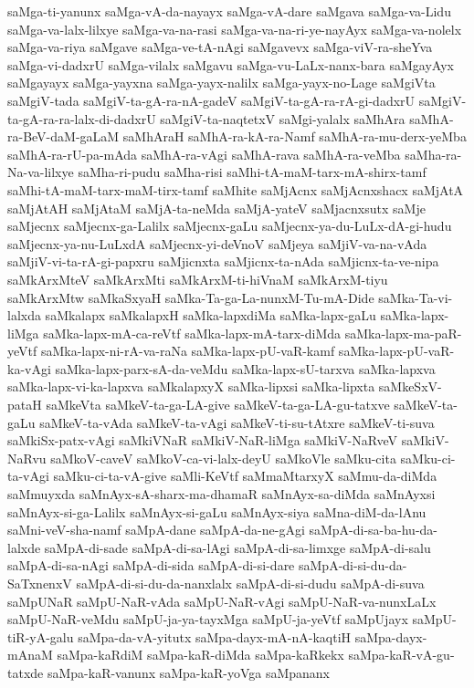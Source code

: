 {saMga-ti-yanunx
saMga-vA-da-nayayx
saMga-vA-dare
saMgava
saMga-va-Lidu
saMga-va-lalx-lilxye
saMga-va-na-rasi
saMga-va-na-ri-ye-nayAyx
saMga-va-nolelx
saMga-va-riya
saMgave
saMga-ve-tA-nAgi
saMgavevx
saMga-viV-ra-sheYva
saMga-vi-dadxrU
saMga-vilalx
saMgavu
saMga-vu-LaLx-nanx-bara
saMgayAyx
saMgayayx
saMga-yayxna
saMga-yayx-nalilx
saMga-yayx-no-Lage
saMgiVta
saMgiV-tada
saMgiV-ta-gA-ra-nA-gadeV
saMgiV-ta-gA-ra-rA-gi-dadxrU
saMgiV-ta-gA-ra-ra-lalx-di-dadxrU
saMgiV-ta-naqtetxV
saMgi-yalalx
saMhAra
saMhA-ra-BeV-daM-gaLaM
saMhAraH
saMhA-ra-kA-ra-Namf
saMhA-ra-mu-derx-yeMba
saMhA-ra-rU-pa-mAda
saMhA-ra-vAgi
saMhA-rava
saMhA-ra-veMba
saMha-ra-Na-va-lilxye
saMha-ri-pudu
saMha-risi
saMhi-tA-maM-tarx-mA-shirx-tamf
saMhi-tA-maM-tarx-maM-tirx-tamf
saMhite
saMjAcnx
saMjAcnxshacx
saMjAtA
saMjAtAH
saMjAtaM
saMjA-ta-neMda
saMjA-yateV
saMjacnxsutx
saMje
saMjecnx
saMjecnx-ga-Lalilx
saMjecnx-gaLu
saMjecnx-ya-du-LuLx-dA-gi-hudu
saMjecnx-ya-nu-LuLxdA
saMjecnx-yi-deVnoV
saMjeya
saMjiV-va-na-vAda
saMjiV-vi-ta-rA-gi-papxru
saMjicnxta
saMjicnx-ta-nAda
saMjicnx-ta-ve-nipa
saMkArxMteV
saMkArxMti
saMkArxM-ti-hiVnaM
saMkArxM-tiyu
saMkArxMtw
saMkaSxyaH
saMka-Ta-ga-La-nunxM-Tu-mA-Dide
saMka-Ta-vi-lalxda
saMkalapx
saMkalapxH
saMka-lapxdiMa
saMka-lapx-gaLu
saMka-lapx-liMga
saMka-lapx-mA-ca-reVtf
saMka-lapx-mA-tarx-diMda
saMka-lapx-ma-paR-yeVtf
saMka-lapx-ni-rA-va-raNa
saMka-lapx-pU-vaR-kamf
saMka-lapx-pU-vaR-ka-vAgi
saMka-lapx-parx-sA-da-veMdu
saMka-lapx-sU-tarxva
saMka-lapxva
saMka-lapx-vi-ka-lapxva
saMkalapxyX
saMka-lipxsi
saMka-lipxta
saMkeSxV-pataH
saMkeVta
saMkeV-ta-ga-LA-give
saMkeV-ta-ga-LA-gu-tatxve
saMkeV-ta-gaLu
saMkeV-ta-vAda
saMkeV-ta-vAgi
saMkeV-ti-su-tAtxre
saMkeV-ti-suva
saMkiSx-patx-vAgi
saMkiVNaR
saMkiV-NaR-liMga
saMkiV-NaRveV
saMkiV-NaRvu
saMkoV-caveV
saMkoV-ca-vi-lalx-deyU
saMkoVle
saMku-cita
saMku-ci-ta-vAgi
saMku-ci-ta-vA-give
saMli-KeVtf
saMmaMtarxyX
saMmu-da-diMda
saMmuyxda
saMnAyx-sA-sharx-ma-dhamaR
saMnAyx-sa-diMda
saMnAyxsi
saMnAyx-si-ga-Lalilx
saMnAyx-si-gaLu
saMnAyx-siya
saMna-diM-da-lAnu
saMni-veV-sha-namf
saMpA-dane
saMpA-da-ne-gAgi
saMpA-di-sa-ba-hu-da-lalxde
saMpA-di-sade
saMpA-di-sa-lAgi
saMpA-di-sa-limxge
saMpA-di-salu
saMpA-di-sa-nAgi
saMpA-di-sida
saMpA-di-si-dare
saMpA-di-si-du-da-SaTxnenxV
saMpA-di-si-du-da-nanxlalx
saMpA-di-si-dudu
saMpA-di-suva
saMpUNaR
saMpU-NaR-vAda
saMpU-NaR-vAgi
saMpU-NaR-va-nunxLaLx
saMpU-NaR-veMdu
saMpU-ja-ya-tayxMga
saMpU-ja-yeVtf
saMpUjayx
saMpU-tiR-yA-galu
saMpa-da-vA-yitutx
saMpa-dayx-mA-nA-kaqtiH
saMpa-dayx-mAnaM
saMpa-kaRdiM
saMpa-kaR-diMda
saMpa-kaRkekx
saMpa-kaR-vA-gu-tatxde
saMpa-kaR-vanunx
saMpa-kaR-yoVga
saMpananx
}
